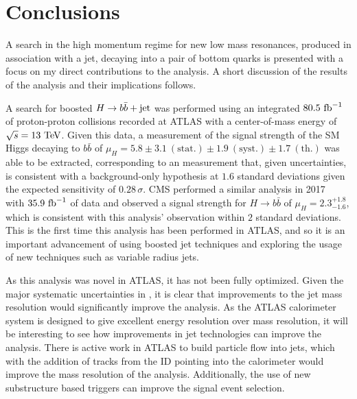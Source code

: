 \chapter{Conclusions}\label{chapter:conclusions}

A search in the high momentum regime for new low mass resonances, produced in association with a jet, decaying into a pair of bottom quarks is presented with a focus on my direct contributions to the analysis.
A short discussion of the results of the analysis and their implications follows.

A search for boosted $H \to b\bar{b}{} +\mathrm{jet}$ was performed using an integrated $80.5~\mathrm{fb}^{-1}$ of proton-proton collisions recorded at ATLAS with a center-of-mass energy of $\sqrt{s} = 13~\mathrm{TeV}$.
Given this data, a measurement of the signal strength of the SM Higgs decaying to $b\bar{b}$ of ${\mu_{H} = 5.8 \pm 3.1~\mathrm{(stat.)} \pm 1.9~\mathrm{(syst.)} \pm 1.7~\mathrm{(th.)}}$ was able to be extracted, corresponding to an measurement that, given uncertainties, is consistent with a background-only hypothesis at $1.6$ standard deviations given the expected sensitivity of $0.28\,\sigma$.
CMS performed a similar analysis in 2017~\cite{CMS:2017cbv} with $35.9~\mathrm{fb}^{-1}$ of data and observed a signal strength for $H\to b\bar{b}$ of ${\mu_{H} = 2.3_{-1.6}^{+1.8}}$, which is consistent with this analysis' observation within $2$ standard deviations.
This is the first time this analysis has been performed in ATLAS, and so it is an important advancement of using boosted jet techniques and exploring the usage of new techniques such as variable radius jets.

As this analysis was novel in ATLAS, it has not been fully optimized.
Given the major systematic uncertainties in , it is clear that improvements to the jet mass resolution would significantly improve the analysis.
As the ATLAS calorimeter system is designed to give excellent energy resolution over mass resolution, it will be interesting to see how improvements in jet technologies can improve the analysis.
There is active work in ATLAS to build particle flow into \largeR{} jets, which with the addition of tracks from the ID pointing into the calorimeter would improve the mass resolution of the analysis.
Additionally, the use of new substructure based triggers can improve the signal event selection.


